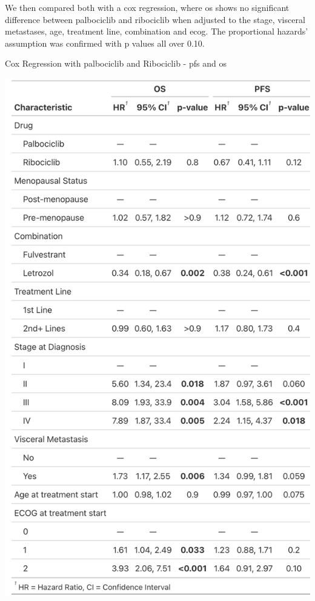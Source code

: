 We then compared both with a cox regression, where \ac{os} shows no significant difference between palbociclib and ribociclib when adjusted to the stage, visceral metastases, age, treatment line, combination and \ac{ecog}. The proportional hazards' assumption was confirmed with p values all over 0.10.
\begin{table}[ht]
  \centering
  \caption{Cox Regression with palbociclib and Ribociclib - \ac{pfs} and \ac{os}}\label{tab:cox} 
  \includegraphics[scale=0.20]{figures/cox_both.png}%

\end{table}

